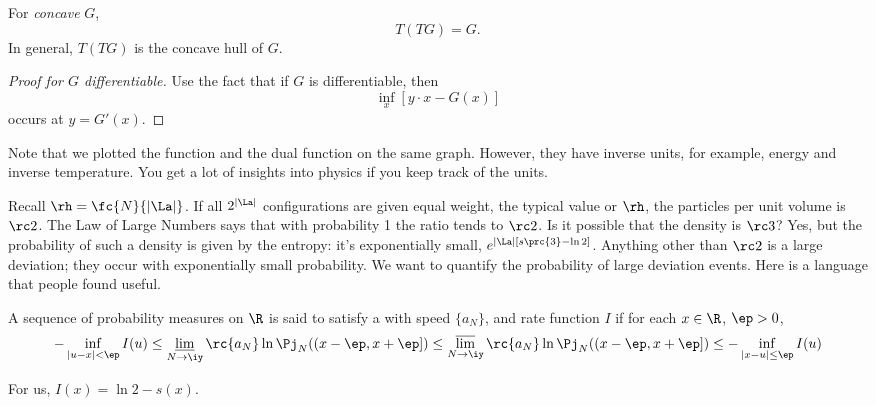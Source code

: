 
\begin{thm}
For \emph{concave} $G$,
\[
T(TG)=G.
\]
In general, $T(TG)$ is the concave hull of $G$. 
\end{thm}
\begin{proof}[Proof for $G$ differentiable]
Use the fact that if $G$ is differentiable, then
\[
\inf_x [y\cdot x - G(x)]
\]
occurs at $y=G'(x)$. %
\end{proof}

Note that we plotted the function and the dual function on the same graph. However, they have inverse units, for example, energy and inverse temperature. You get a lot of insights into physics if you keep track of the units.


Recall $\rh=\fc{N}{|\La|}$. %
If all $2^{|\La|}$ configurations are given equal weight, the typical value or $\rh$, the particles per unit volume is $\rc2$. The Law of Large Numbers says that with probability 1 the ratio tends to $\rc2$. Is it possible that the density is $\rc3$? Yes, but the probability of such a density is given by the entropy: it's exponentially small, $e^{|\La|[s\prc{3} -\ln 2]}$. Anything other than $\rc2$ is a large deviation; they occur with exponentially small probability. We want to quantify the probability of large deviation events. Here is a language that people found useful.
\begin{df}
A sequence of probability measures on $\R$ is said to satisfy a  with speed $\{a_N\}$, and rate function $I$ if for each $x\in \R$, $\ep>0$,
\[
-\inf_{|u-x|<\ep} I(u)\le 
\varliminf_{N\to \iy}\rc{a_N} \ln \Pj_N((x-\ep,x+\ep]) \le \varlimsup_{N\to \iy} \rc{a_N} \ln \Pj_N((x-\ep,x+\ep]) \le 
-\inf_{|x-u|\le \ep} I(u)
\]
\end{df}
For us, $I(x)=\ln 2 - s(x)$.
